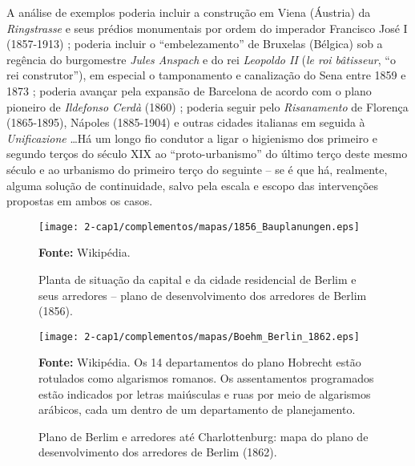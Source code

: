 A análise de exemplos poderia incluir a construção em Viena (Áustria) da \textit{Ringstrasse} e seus prédios monumentais por ordem do imperador Francisco José I (1857-1913) \cite{abercrombie_vienna_1910,abercrombie_vienna_1911,aman_vienna_1911}; poderia incluir o ``embelezamento'' de Bruxelas (Bélgica) sob a regência do burgomestre \textit{Jules Anspach} e do rei \textit{Leopoldo II} (\textit{le roi bâtisseur}, ``o rei construtor''), em especial o tamponamento e canalização do Sena entre 1859 e 1873 \cite{abercrombie_brussels1_1912,abercrombie_brussels2_1912,abercrombie_brussels3_1913}; poderia avançar pela expansão de Barcelona de acordo com o plano pioneiro de \textit{Ildefonso Cerdà} (1860) \cite{aibarbijker_barcelona_1997,ciervo_cerda_1976,soriaypuig_cerda_1995,wynn_barcelona_1979}; poderia seguir pelo \textit{Risanamento} de Florença (1865-1895), Nápoles (1885-1904) e outras cidades italianas em seguida à \textit{Unificazione} \cite{biocca_naples_1992,parisi_napoli_2001,piccinato_igiene_1989,rossi_napoli_2011}\dots Há um longo fio condutor a ligar o higienismo dos primeiro e segundo terços do século XIX ao ``proto-urbanismo'' do último terço deste mesmo século e ao urbanismo do primeiro terço do seguinte -- se é que há, realmente, alguma solução de continuidade, salvo pela escala e escopo das intervenções propostas em ambos os casos. 

\begin{figure}[!htp]
\centering
\texttt{[image: 2-cap1/complementos/mapas/1856\_Bauplanungen.eps]}{\par \footnotesize \textbf{Fonte:} Wikipédia. \par}
\label{fig:bauplannungen1856} 
\caption{Planta de situação da capital e da cidade residencial de Berlim e seus arredores -- plano de desenvolvimento dos arredores de Berlim (1856).}
\end{figure}

\begin{figure}[!htp]
\centering
\texttt{[image: 2-cap1/complementos/mapas/Boehm\_Berlin\_1862.eps]}{\par \footnotesize \textbf{Fonte:} Wikipédia. Os 14 departamentos do plano Hobrecht estão rotulados como algarismos romanos. Os assentamentos programados estão indicados por letras maiúsculas e ruas por meio de algarismos arábicos, cada um dentro de um departamento de planejamento. \par}
\label{fig:berlin1862} 
\caption{Plano de Berlim e arredores até Charlottenburg: mapa do plano de desenvolvimento dos arredores de Berlim (1862).}
\end{figure}

